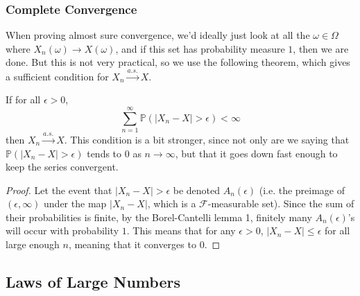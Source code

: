 \documentclass{article}
\begin{document}
    \subsubsection{Complete Convergence}

      When proving almost sure convergence, we'd ideally just look at all the $\omega \in \Omega$ where $X_n (\omega) \rightarrow X(\omega)$, and if this set has probability measure $1$, then we are done. But this is not very practical, so we use the following theorem, which gives a sufficient condition for $X_n \xrightarrow{a.s.} X$. 

      \begin{theorem}
        If for all $\epsilon > 0$, 
        \begin{equation}
          \sum_{n=1}^\infty \mathbb{P}(|X_n - X| > \epsilon ) < \infty
        \end{equation}
        then $X_n \xrightarrow{a.s.} X$. This condition is a bit stronger, since not only are we saying that $\mathbb{P}(|X_n - X| > \epsilon)$ tends to $0$ as $n \rightarrow \infty$, but that it goes down fast enough to keep the series convergent. 
      \end{theorem}
      \begin{proof}
        Let the event that $|X_n - X| > \epsilon$ be denoted $A_n (\epsilon)$ (i.e. the preimage of $(\epsilon, \infty)$ under the map $|X_n - X|$, which is a $\mathcal{F}$-measurable set). Since the sum of their probabilities is finite, by the Borel-Cantelli lemma 1, finitely many $A_n(\epsilon)$'s will occur with probability $1$. This means that for any $\epsilon > 0$, $|X_n - X| \leq \epsilon$ for all large enough $n$, meaning that it converges to $0$. 
      \end{proof}

  \subsection{Laws of Large Numbers}
\end{document}
